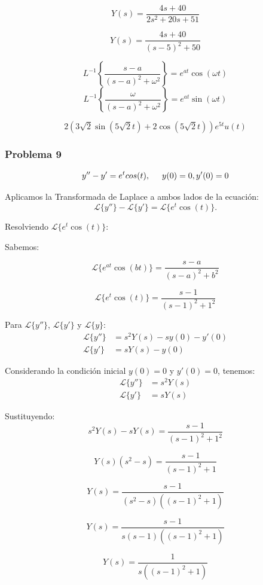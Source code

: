 \documentclass{article}
\begin{document}
\[
    Y(s) = \frac{4s + 40}{2s^2 + 20s + 51}
\]

\[
    Y(s) = \frac{4s + 40}{(s-5)^2+50}
\]

\[
    L^{-1}\left\{\frac{s-a}{(s-a)^2 + \omega^2}\right\} = e^{at} \cos(\omega t)
\]
\[
    L^{-1}\left\{\frac{\omega}{(s-a)^2 + \omega^2}\right\} = e^{at} \sin(\omega t)
\]

\[
    2\left(3\sqrt{2}\sin(5\sqrt{2}t) + 2\cos(5\sqrt{2}t)\right)e^{5t}u(t)
\]


\newpage


\subsubsection{Problema 9}

\[y'' - y' = e^{t}cos(t), \hspace{.5cm} y(0) = 0, y'(0) = 0 \]

Aplicamos la Transformada de Laplace a ambos lados de la ecuación:
\[
    \mathcal{L}\{y''\} - \mathcal{L}\{y'\} = \mathcal{L}\{e^t\cos(t)\}.
\]

Resolviendo $\mathcal{L}\{e^t\cos(t)\}$:

Sabemos:

\[
    \mathcal{L}\{e^{at}\cos(bt)\} = \frac{s-a}{(s-a)^2 + b^2}
\]

\[
    \mathcal{L}\{e^t\cos(t)\} = \frac{s-1}{(s-1)^2 + 1^2}
\]

Para \(\mathcal{L}\{y''\}\), \(\mathcal{L}\{y'\}\) y \(\mathcal{L}\{y\}\):
\begin{align*}
    \mathcal{L}\{y''\} & = s^2Y(s) - sy(0) - y'(0) \\
    \mathcal{L}\{y'\}  & = sY(s) - y(0)
\end{align*}

Considerando la condición inicial $y(0) = 0$ y $y'(0) = 0$, tenemos:
\begin{align*}
    \mathcal{L}\{y''\} & = s^2Y(s) \\
    \mathcal{L}\{y'\}  & = sY(s)
\end{align*}

Sustituyendo:
\[
    s^2Y(s) - sY(s) = \frac{s-1}{(s-1)^2 + 1^2}
\]

\[
    Y(s)(s^2 - s) = \frac{s-1}{(s-1)^2 + 1}
\]

\[
    Y(s) = \frac{s-1}{(s^2 - s)((s-1)^2 + 1)}
\]

\[
    Y(s) = \frac{s-1}{s(s - 1)((s-1)^2 + 1)}
\]

\[
    Y(s) = \frac{1}{s((s-1)^2 + 1)}
\]
\end{document}
